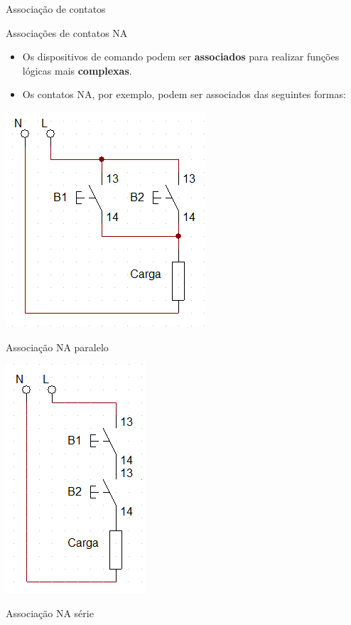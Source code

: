 \begin{frame}{Associação de contatos}
\begin{block}{Associações de contatos NA}
\begin{itemize}
    \item Os dispositivos de comando podem ser \textbf{associados} para realizar funções lógicas mais \textbf{complexas}.
    \item Os contatos NA, por exemplo, podem ser associados das seguintes formas:
\end{itemize}
\end{block}

\begin{minipage}{0.45\linewidth}
	\centering
	\includegraphics[width=0.7\linewidth]{Figuras/Ch06/fig4.jpg}
	
	Associação NA paralelo
\end{minipage}
\hfill
\begin{minipage}{0.45\linewidth}
	\centering
	\includegraphics[width=0.5\linewidth]{Figuras/Ch06/fig5.jpg}
	
	Associação NA série
\end{minipage}
\end{frame}

